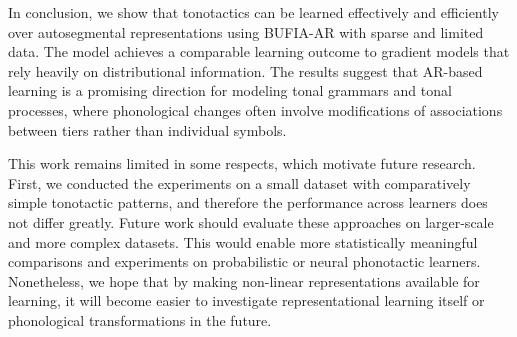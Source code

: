 In conclusion, we show that tonotactics can be learned
effectively and efficiently over autosegmental representations
using BUFIA-AR with sparse and limited data. The model
achieves a comparable learning outcome to gradient models
that rely heavily on distributional information.
The results suggest that AR-based learning is a promising
direction for modeling tonal grammars and tonal processes,
where phonological changes often involve modifications of
associations between tiers rather than individual symbols.

This work remains limited in some respects, which motivate 
future research. First, we conducted the experiments on a 
small dataset with comparatively simple tonotactic patterns, 
and therefore the performance across learners does not differ 
greatly. Future work should evaluate these approaches on 
larger-scale and more complex datasets. This would enable more 
statistically meaningful comparisons and experiments on probabilistic 
or neural phonotactic learners. Nonetheless, we hope that by 
making non-linear representations available for learning, 
it will become easier to investigate representational learning itself 
or phonological transformations in the future.


